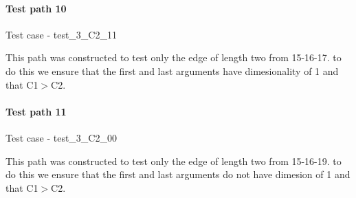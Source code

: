 \paragraph{Test path 10}%
Test case - test\_3\_C2\_11

This path was constructed to test only the edge of length two from 15-16-17. to do this we ensure that the first and last arguments have dimesionality of 1 and that C1$>$C2.

\paragraph{Test path 11}%
Test case - test\_3\_C2\_00

This path was constructed to test only the edge of length two from 15-16-19. to do this we ensure that the first and last arguments do not have dimesion of 1 and that C1$>$C2.
